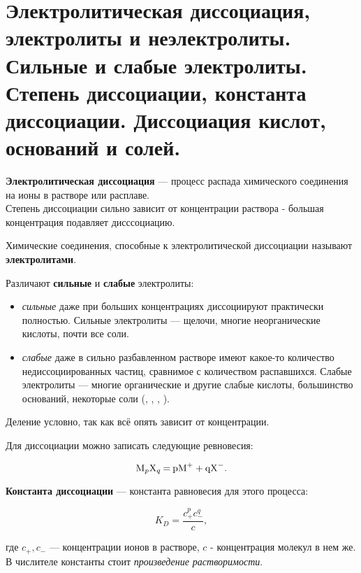 
\section{Электролитическая диссоциация, электролиты и неэлектролиты. Сильные и слабые электролиты. Степень диссоциации, константа диссоциации. Диссоциация кислот, оснований и солей.}

\textbf{Электролитическая диссоциация} --- процесс распада химического соединения на ионы в растворе или расплаве.\\

Степень диссоциации сильно зависит от концентрации раствора - большая концентрация подавляет дисссоциацию.

Химические соединения, способные к электролитической диссоциации называют \textbf{электролитами}.

Различают \textbf{сильные} и \textbf{слабые} электролиты:

\begin{itemize}
	\item \textit{сильные} даже при больших концентрациях диссоциируют практически полностью. Сильные электролиты --- щелочи, многие неорганические кислоты, почти все соли. 
	\item \textit{слабые} даже в сильно разбавленном растворе имеют какое-то количество недиссоциированных частиц, сравнимое с количеством распавшихся. Слабые электролиты --- многие органические и другие слабые кислоты, большинство оснований, некоторые соли (, , , ). 
\end{itemize}

Деление условно, так как всё опять зависит от концентрации.

Для диссоциации можно записать следующие ревновесия:

\begin{equation*}
\ce{M_pX_q = pM^+ + qX^-}.
\end{equation*}

\textbf{Константа диссоциации} --- константа равновесия для этого процесса:

\begin{equation*}
K_D = \frac{c_{+}^{p}c_{-}^{q}}{c},
\end{equation*}

где $c_{+}, c_{-}$ --- концентрации ионов в растворе, $c$ - концентрация молекул в нем же. В числителе константы стоит \textit{произведение растворимости}.\\

